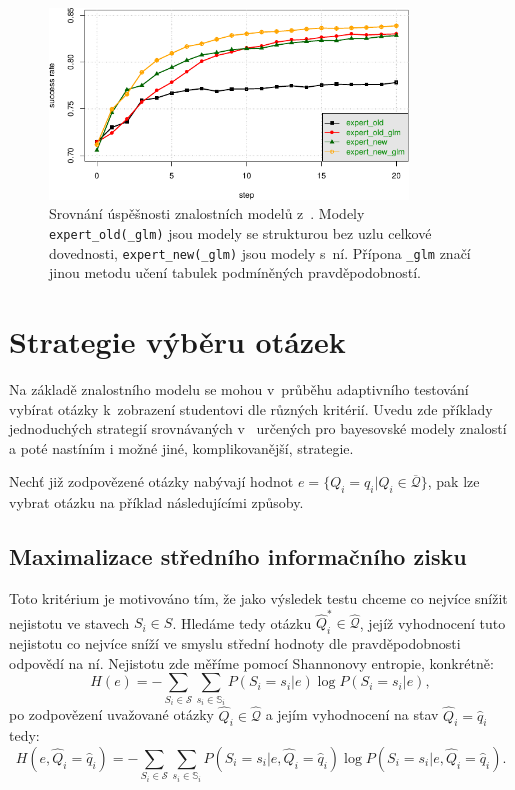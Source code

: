 \documentclass[a4paper,twoside,12pt]{scrbook}
\begin{document}
\begin{figure}
  \centering
    \includegraphics[width=0.85\textwidth]{comparison_chart_plajner16.pdf}
  \caption{Srovnání úspěšnosti znalostních modelů z~\cite{plajner16}. Modely \texttt{expert\_old(\_glm)} jsou modely se strukturou bez uzlu celkové dovednosti, \texttt{expert\_new(\_glm)} jsou modely s~ní. Přípona \texttt{\_glm} značí jinou metodu učení tabulek podmíněných pravděpodobností.}
  \label{fig:comparison_chart_plajner16}
\end{figure}


\section{Strategie výběru otázek}
\label{sec:question_selection}
Na základě znalostního modelu se mohou v~průběhu adaptivního testování vybírat otázky k~zobrazení studentovi dle různých kritérií. Uvedu zde příklady jednoduchých  strategií srovnávaných v~\cite{question_selection} určených pro bayesovské modely znalostí a poté nastíním i možné jiné, komplikovanější, strategie.

Nechť již zodpovězené otázky nabývají hodnot $e=\{Q_i=q_i|Q_i\in\overline{\mathcal{Q}}\}$, pak lze vybrat otázku na příklad následujícími způsoby.

\subsection{Maximalizace středního informačního zisku}
\label{subsec:information_gain}
Toto kritérium je motivováno tím, že jako výsledek testu chceme co nejvíce snížit nejistotu ve stavech $S_i \in S$. Hledáme tedy otázku $\widehat{Q}^*_i \in \widehat{\mathcal{Q}}$, jejíž vyhodnocení tuto nejistotu co nejvíce sníží ve smyslu střední hodnoty dle pravděpodobnosti odpovědí na ní. Nejistotu zde měříme pomocí Shannonovy entropie, konkrétně:
\begin{equation}
	H(e) = -\sum_{S_i \in \mathcal{S}}\sum_{s_i \in \mathbb{S}_i}P(S_i=s_i|e) \log{}P(S_i=s_i|e),
\end{equation}
po zodpovězení uvažované otázky $\widehat{Q}_i \in \widehat{\mathcal{Q}}$ a jejím vyhodnocení na stav $\widehat{Q}_i = \widehat{q}_i$ tedy:
\begin{equation}
	H(e, \widehat{Q}_i = \widehat{q}_i) = -\sum_{S_i \in \mathcal{S}}\sum_{s_i \in \mathbb{S}_i}P(S_i=s_i|e, \widehat{Q}_i = \widehat{q}_i) \log{}P(S_i=s_i|e, \widehat{Q}_i = \widehat{q}_i).
\end{equation}
\end{document}
